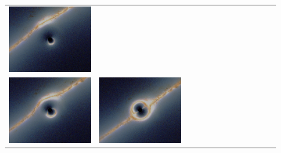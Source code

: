 \documentclass[compress]{beamer}
\begin{document}
\begin{frame}
\begin{tabular}{p{0.3\linewidth} p{0.3\linewidth} p{0.3\linewidth}}
\includegraphics[width=\linewidth]{pictures/black_hole_lensing3.png} \\
\includegraphics[width=\linewidth]{pictures/black_hole_lensing4.png} &
\includegraphics[width=\linewidth]{pictures/black_hole_lensing5.png} &

\end{tabular}
\end{frame}
\end{document}
